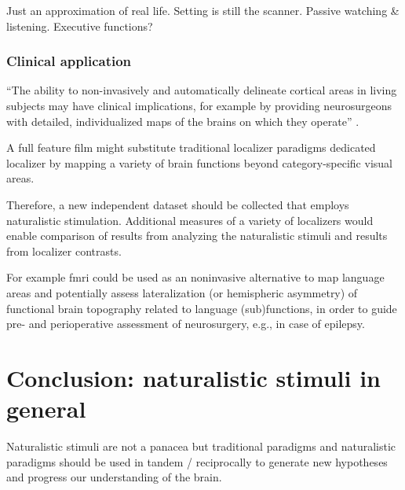 %
Just an approximation of real life.
%
Setting is still the scanner.
%
Passive watching \& listening.
%
Executive functions?


\subsubsection{Clinical application}



%
``The ability to non-invasively and automatically delineate cortical areas in
living subjects may have clinical implications, for example by providing
neurosurgeons with detailed, individualized maps of the brains on which they
operate'' \citep{glasser2016multi}.

%
A full feature film might substitute traditional localizer paradigms dedicated
localizer by mapping a variety of brain functions beyond category-specific
visual areas.

%
Therefore, a new independent dataset should be collected that employs
naturalistic stimulation.
%
Additional measures of a variety of localizers would enable comparison of
results from analyzing the naturalistic stimuli and results from localizer
contrasts.

%
For example \ac{fmri} could be used as an noninvasive alternative to map
language areas and potentially assess lateralization (or hemispheric asymmetry)
of functional brain topography related to language (sub)functions, in order to
guide pre- and perioperative assessment of neurosurgery, e.g., in case of
epilepsy.




\section{Conclusion: naturalistic stimuli in general}
%
Naturalistic stimuli are not a panacea but traditional paradigms and
naturalistic paradigms should be used in tandem / reciprocally to generate new
hypotheses and progress our understanding of the brain.


